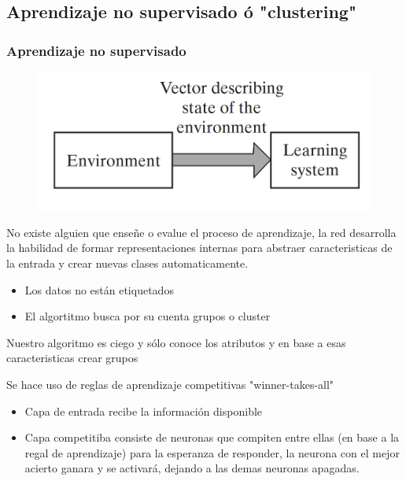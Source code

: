 \documentclass[
	11pt, %
]{beamer}
\begin{document}
\subsection{Aprendizaje no supervisado ó "clustering"}
\begin{frame}
  \frametitle{Aprendizaje no supervisado}

  \begin{figure}
    \includegraphics[width=0.4\linewidth]{unsupervised.png}
  \end{figure}
  
  No existe alguien que enseñe o evalue el proceso de aprendizaje, la red desarrolla la habilidad de formar representaciones internas para abstraer caracteristicas de la entrada y crear nuevas clases automaticamente.

  \bigskip %
  
  \begin{itemize}
    \item Los datos no están etiquetados
    \item El algortitmo busca por su cuenta grupos o cluster
  \end{itemize}

  \bigskip %
  
  Nuestro algoritmo es ciego y sólo conoce los atributos y en base a esas caracteristicas crear grupos

\end{frame}

\begin{frame}

  Se hace uso de reglas de aprendizaje competitivas "winner-takes-all"

  \bigskip %

  \begin{itemize}
     \item Capa de entrada recibe la información disponible 
     \item Capa competitiba consiste de neuronas que compiten entre ellas (en base a la regal de aprendizaje) para la esperanza de responder, la neurona con el mejor acierto ganara y se activará, dejando a las demas neuronas apagadas.
  \end{itemize}
  
\end{frame}
\end{document}
